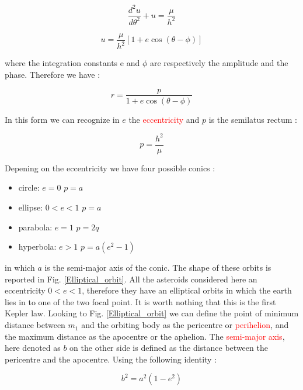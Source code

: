 \documentclass[12pt,%
               a4paper,%
               oneside,openany,%
               titlepage,%
               headinclude,footinclude,%
               BCOR5mm,%
               cleardoublepage=empty,%
               tablecaptionabove,%
               floatperchapter,
               ]{scrreprt}                 %
\begin{document}
\begin{equation}
\dfrac{d^{2}u}{d\theta^{2}}+u=\frac{\mu}{h^{2}}
\end{equation}

\begin{equation}
u=\frac{\mu}{h^{2}}\left[1+e\cos(\theta-\phi)\right]
\end{equation}

where the integration constants e and $\phi$ are respectively the amplitude and the phase. Therefore we have \cite{murray1999solar}:

\begin{equation}
r=\dfrac{p}{1+e\cos(\theta-\phi)}
\end{equation}

In this form we can recognize in $e$ the \textcolor{red}{eccentricity} and $p$ is the semilatus rectum \cite{murray1999solar}:

\begin{equation}
p=\frac{h^{2}}{\mu}
\end{equation}

Depening on the eccentricity we have four possible conics \cite{murray1999solar}:

\begin{itemize}
\item circle:  $e=0$ \quad $p=a$
\item ellipse: $0<e<1$ \quad $p=a$
\item parabola: $e=1$ \quad $p=2q$
\item hyperbola: $e>1$ \quad $p=a(e^{2}-1)$
\end{itemize}

in which $a$ is the semi-major axis of the conic. The shape of these orbits is reported in Fig. \ref{Elliptical_orbit}. All the asteroids considered here an eccentricity $0<e<1$, therefore they have an elliptical orbits in which the earth lies in to one of the two focal point. It is worth nothing that this is the first Kepler law.  Looking to Fig. \ref{Elliptical_orbit} we can define the point of minimum distance between $m_{1}$ and the orbiting body as the pericentre or \textcolor{red}{perihelion}, and the maximum distance as the apocentre or the aphelion. The \textcolor{red}{semi-major axis}, here denoted as $b$ on the other side is defined as the distance between the pericentre and the apocentre. Using the following identity \cite{murray1999solar}:

\begin{equation}
b^{2}=a^{2}(1-e^{2})
\end{equation}
\end{document}
